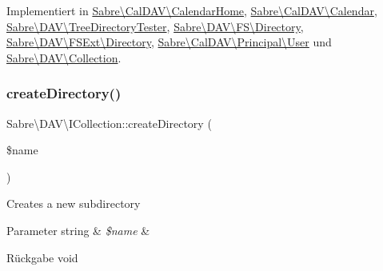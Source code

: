 Implementiert in \mbox{\hyperlink{class_sabre_1_1_cal_d_a_v_1_1_calendar_home_a2798ea68cdc85f2273a5fe800b9693c5}{Sabre\textbackslash{}\+Cal\+D\+A\+V\textbackslash{}\+Calendar\+Home}}, \mbox{\hyperlink{class_sabre_1_1_cal_d_a_v_1_1_calendar_a12d080fe5176db762382268f40f70c0f}{Sabre\textbackslash{}\+Cal\+D\+A\+V\textbackslash{}\+Calendar}}, \mbox{\hyperlink{class_sabre_1_1_d_a_v_1_1_tree_directory_tester_aa220332b01cdebf6cfdbfb23a4808849}{Sabre\textbackslash{}\+D\+A\+V\textbackslash{}\+Tree\+Directory\+Tester}}, \mbox{\hyperlink{class_sabre_1_1_d_a_v_1_1_f_s_1_1_directory_a30d9098d57f5e0ffb0cdb782f2a22ec0}{Sabre\textbackslash{}\+D\+A\+V\textbackslash{}\+F\+S\textbackslash{}\+Directory}}, \mbox{\hyperlink{class_sabre_1_1_d_a_v_1_1_f_s_ext_1_1_directory_a7fd5c47b0712920ba3d565f9c878ff46}{Sabre\textbackslash{}\+D\+A\+V\textbackslash{}\+F\+S\+Ext\textbackslash{}\+Directory}}, \mbox{\hyperlink{class_sabre_1_1_cal_d_a_v_1_1_principal_1_1_user_a4a3f312b08c5c80ff35fdf00ae8c92f8}{Sabre\textbackslash{}\+Cal\+D\+A\+V\textbackslash{}\+Principal\textbackslash{}\+User}} und \mbox{\hyperlink{class_sabre_1_1_d_a_v_1_1_collection_ae51aca8bc4fecd69064bdd0cf2cda6fa}{Sabre\textbackslash{}\+D\+A\+V\textbackslash{}\+Collection}}.

\mbox{\label{interface_sabre_1_1_d_a_v_1_1_i_collection_a11e8eb888fffe1d792acebbe5bc59243}} 
\subsubsection{\texorpdfstring{create\+Directory()}{createDirectory()}}
{\footnotesize\ttfamily Sabre\textbackslash{}\+D\+A\+V\textbackslash{}\+I\+Collection\+::create\+Directory (\begin{DoxyParamCaption}\item[{}]{\$name }\end{DoxyParamCaption})}

Creates a new subdirectory


\begin{DoxyParams}[1]{Parameter}
string & {\em \$name} & \\
\hline
\end{DoxyParams}
\begin{DoxyReturn}{Rückgabe}
void 
\end{DoxyReturn}


